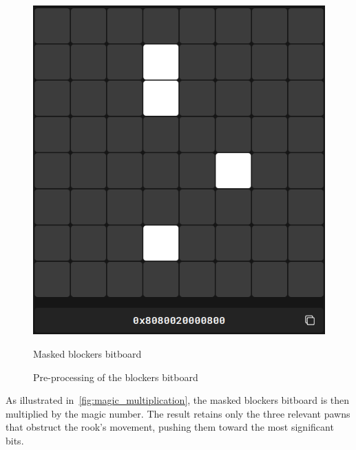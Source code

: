 \begin{figure}
\begin{minipage}[c]{0.4\textwidth}
        \includegraphics[width=\textwidth]{Imagenes/magics_processed_blockers.png}
        \caption{Masked blockers bitboard}
    \end{minipage}
    \caption{Pre-processing of the blockers bitboard}\label{fig:magic_preprocessing}
\end{figure}

\noindent As illustrated in~\ref{fig:magic_multiplication}, the masked blockers bitboard is then multiplied by the magic number. The result retains only the three relevant pawns that obstruct the rook's movement, pushing them toward the most significant bits.

\vspace{1em}

